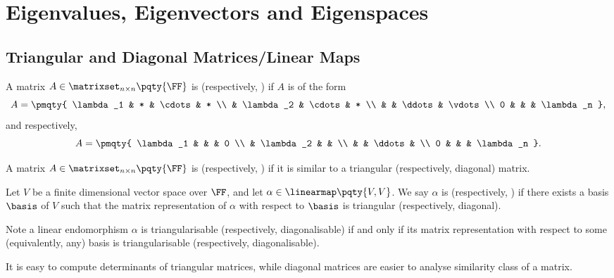 \section{Eigenvalues, Eigenvectors and Eigenspaces}
\subsection{Triangular and Diagonal Matrices/Linear Maps}

\begin{definition}
    A matrix \(A \in \matrixset_{n \times n} \pqty{\FF}\) is  (respectively, ) if \(A\) is of the form
    \[
        A = \pmqty{
            \lambda_1 & * & \cdots & * \\
             & \lambda_2 & \cdots & * \\
             & & \ddots & \vdots \\
            0 & & & \lambda_n
        },
    \]
    and respectively,
    \[
        A = \pmqty{
            \lambda_1 &  & & 0 \\
             & \lambda_2 & &  \\
             & & \ddots & \\
            0 & & & \lambda_n
        }.
    \]

    A matrix \(A \in \matrixset_{n \times n} \pqty{\FF}\) is  (respectively, ) if it is similar to a triangular (respectively, diagonal) matrix.

    Let \(V\) be a finite dimensional vector space over \(\FF\), and let \(\alpha \in \linearmap\pqty{V, V}\). We say \(\alpha\) is  (respectively, ) if there exists a basis \(\basis\) of \(V\) such that the matrix representation of \(\alpha\) with respect to \(\basis\) is triangular (respectively, diagonal).
\end{definition}

\begin{remark}
    Note a linear endomorphism \(\alpha\) is triangularisable (respectively, diagonalisable) if and only if its matrix representation with respect to some (equivalently, any) basis is triangularisable (respectively, diagonalisable).
\end{remark}

It is easy to compute determinants of triangular matrices, while diagonal matrices are easier to analyse similarity class of a matrix.

